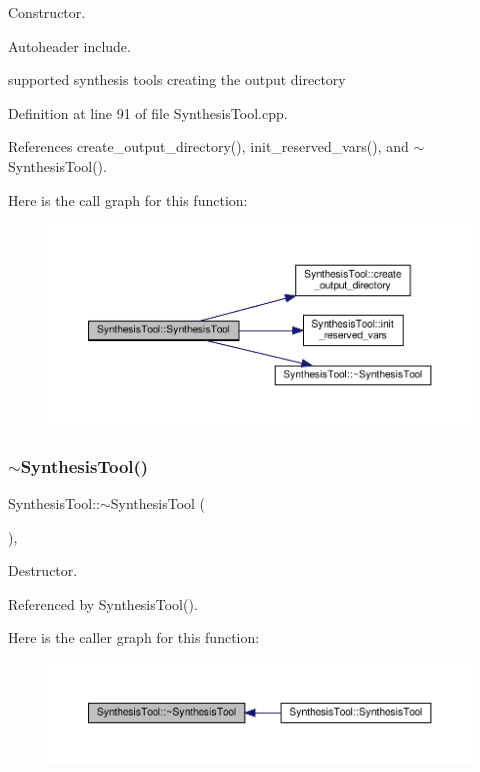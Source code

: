 Constructor. 

Autoheader include.

supported synthesis tools creating the output directory 

Definition at line 91 of file Synthesis\+Tool.\+cpp.



References create\+\_\+output\+\_\+directory(), init\+\_\+reserved\+\_\+vars(), and $\sim$\+Synthesis\+Tool().

Here is the call graph for this function\+:
\nopagebreak
\begin{figure}[H]
\begin{center}
\leavevmode
\includegraphics[width=350pt]{d9/de0/classSynthesisTool_a2a61e2a0d17d1365585660434ac66107_cgraph}
\end{center}
\end{figure}
\mbox{\label{classSynthesisTool_a69e65e0fed1ddecfe8a501324598cc1c}} 
\subsubsection{\texorpdfstring{$\sim$\+Synthesis\+Tool()}{~SynthesisTool()}}
{\footnotesize\ttfamily Synthesis\+Tool\+::$\sim$\+Synthesis\+Tool (\begin{DoxyParamCaption}{ }\end{DoxyParamCaption})\hspace{0.3cm}{\ttfamily [virtual]}, {\ttfamily [default]}}



Destructor. 



Referenced by Synthesis\+Tool().

Here is the caller graph for this function\+:
\nopagebreak
\begin{figure}[H]
\begin{center}
\leavevmode
\includegraphics[width=350pt]{d9/de0/classSynthesisTool_a69e65e0fed1ddecfe8a501324598cc1c_icgraph}
\end{center}
\end{figure}


